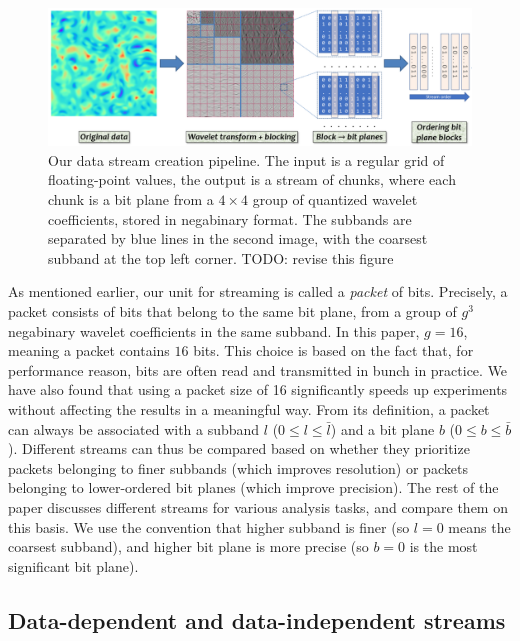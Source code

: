 \begin{figure}[h]
  \centering
  \includegraphics[width=\linewidth]{img/pipeline.png}
  \caption{Our data stream creation pipeline. The input is a regular grid of floating-point values,
  the output is a stream of chunks, where each chunk is a bit plane from a $4\times 4$ group of
  quantized wavelet coefficients, stored in negabinary format. The subbands are separated by blue
  lines in the second image, with the coarsest subband at the top left corner. TODO: revise this
  figure}
  \label{fig:pipeline}
\end{figure}

As mentioned earlier, our unit for streaming is called a \emph{packet} of bits. Precisely, a packet
consists of bits that belong to the same bit plane, from a group of $g^3$ negabinary wavelet
coefficients in the same subband. In this paper, $g=16$, meaning a packet contains $16$ bits. This
choice is based on the fact that, for performance reason, bits are often read and transmitted in
bunch in practice. We have also found that using a packet size of 16 significantly speeds up
experiments without affecting the results in a meaningful way. From its definition, a packet can
always be associated with a subband $l$ ($0\leq l\leq \bar{l}$) and a bit plane $b$ ($0\leq b\leq
\bar{b}$). Different streams can thus be compared based on whether they prioritize packets belonging
to finer subbands (which improves resolution) or packets belonging to lower-ordered bit planes
(which improve precision). The rest of the paper discusses different streams for various analysis
tasks, and compare them on this basis. We use the convention that higher subband is finer (so $l=0$
means the coarsest subband), and higher bit plane is more precise (so $b=0$ is the most significant
bit plane).

\subsection{Data-dependent and data-independent streams}
\label{sec:static-dynamic-streams}

